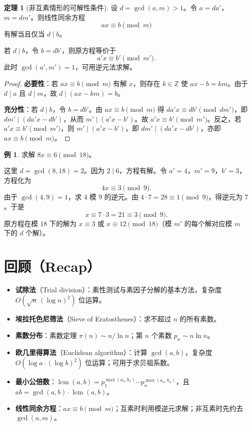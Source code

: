 \documentclass[UTF8,11pt,a4paper]{ctexbook}   %
\theoremstyle{definition}
\newtheorem{theorem}{定理}[section]
\newtheorem{example}{例}[section]
\DeclareMathOperator{\lcm}{lcm}
\begin{document}
\begin{theorem}[非互素情形的可解性条件]
设 $d = \gcd(a,m) > 1$。令 $a = da'$，$m = dm'$。则线性同余方程
\[
ax \equiv b \pmod m
\]
有解当且仅当 $d \mid b$。

若 $d \mid b$，令 $b = db'$，则原方程等价于
\[
a'x \equiv b' \pmod{m'}.
\]
此时 $\gcd(a',m')=1$，可用逆元法求解。
\end{theorem}

\begin{proof}
\textbf{必要性}：若 $ax \equiv b \pmod m$ 有解 $x$，则存在 $k\in\mathbb{Z}$ 使 $ax-b=km$。由于 $d\mid a$ 且 $d\mid m$，故 $d\mid(ax-km)=b$。

\textbf{充分性}：若 $d\mid b$，令 $b=db'$。由 $ax\equiv b\pmod m$ 得 $da'x\equiv db'\pmod{dm'}$，即 $dm'\mid(da'x-db')$，从而 $m'\mid(a'x-b')$。故 $a'x\equiv b'\pmod{m'}$。反之，若 $a'x\equiv b'\pmod{m'}$，则 $m'\mid(a'x-b')$，即 $dm'\mid(da'x-db')$，亦即 $ax\equiv b\pmod m$。
\end{proof}

\begin{example}
求解 $8x \equiv 6 \pmod{18}$。

这里 $d=\gcd(8,18)=2$。因为 $2 \mid 6$，方程有解。令 $a'=4$，$m'=9$，$b'=3$，方程化为
\[
4x \equiv 3 \pmod 9.
\]
由于 $\gcd(4,9)=1$，求 $4$ 模 $9$ 的逆元。由 $4\cdot 7 = 28 \equiv 1 \pmod 9$，得逆元为 $7$。于是
\[
x \equiv 7\cdot 3 = 21 \equiv 3 \pmod 9.
\]
原方程在模 $18$ 下的解为 $x \equiv 3$ 或 $x \equiv 12 \pmod{18}$（模 $m'$ 的每个解对应模 $m$ 下的 $d$ 个解）。
\end{example}

\section{回顾（Recap）}

\begin{itemize}
    \item \textbf{试除法}（Trial division）：素性测试与素因子分解的基本方法，复杂度 $O(\sqrt{n}\,(\log n)^2)$ 位运算。
    \item \textbf{埃拉托色尼筛法}（Sieve of Eratosthenes）：求不超过 $n$ 的所有素数。
    \item \textbf{素数分布}：素数定理 $\pi(n) \sim n/\ln n$；第 $n$ 个素数 $p_n \sim n\ln n$。
    \item \textbf{欧几里得算法}（Euclidean algorithm）：计算 $\gcd(a,b)$，复杂度 $O(\log a\cdot(\log b)^2)$ 位运算；可用于求贝祖系数。
    \item \textbf{最小公倍数}：$\lcm(a,b)=p_1^{\max(a_1,b_1)}\cdots p_n^{\max(a_n,b_n)}$，且 $ab=\gcd(a,b)\cdot\lcm(a,b)$。
    \item \textbf{线性同余方程}：$ax\equiv b\pmod m$；互素时利用模逆元求解；非互素时先约去 $\gcd(a,m)$。
\end{itemize}
\end{document}
